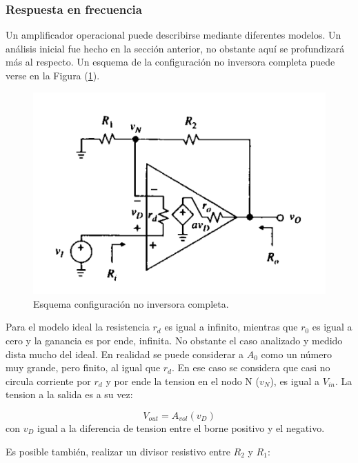 \subsubsection{Respuesta en frecuencia}

Un amplificador operacional puede describirse mediante diferentes modelos. Un análisis inicial fue hecho en la sección anterior, no obstante aquí se profundizará más al respecto. Un esquema de la configuración no inversora completa puede verse en la Figura (\ref{fig:esquema_no_inversor}). 

\begin{figure}[H]	
	\centering
	\includegraphics[width=\textwidth]{Ejercicio2/Imagenes/Rin_no_inversor.png}
	\caption{Esquema configuración no inversora completa.}
	\label{fig:esquema_no_inversor}
\end{figure}

Para el modelo ideal la resistencia $r_d$ es igual a infinito, mientras que $r_0$ es igual a cero y la ganancia es por ende, infinita. No obstante el caso analizado y medido dista mucho del ideal. En realidad se puede considerar a $A_0$ como un número muy grande, pero finito, al igual que $r_d$. En ese caso se considera que casi no circula corriente por $r_d$ y por ende la tension en el nodo N ($v_N$), es igual a $V_{in}$. La tension a la salida es a su vez:

\begin{equation}\label{eq:ganancia}
V_{out} = A_{vol}(v_D)
\end{equation}
con $v_D$ igual a la diferencia de tension entre el borne positivo y el negativo. 

Es posible también, realizar un divisor resistivo entre $R_2$ y $R_1$:

